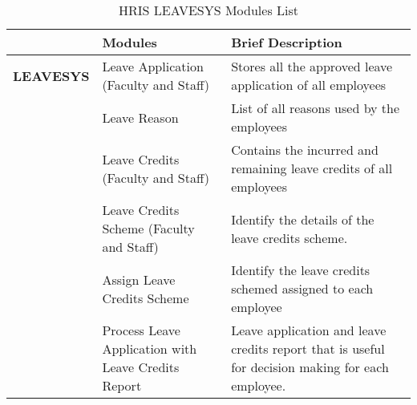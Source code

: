 \begin{table}[H]
\begin{tabular}{@{}p{2cm}p{3.5cm}p{9cm}@{}}
\toprule
\multicolumn{1}{l}{} & \textbf{Modules}                                    & \textbf{Brief Description}                                                                       \\ \midrule
\textbf{LEAVESYS}    & Leave Application (Faculty and Staff)               & Stores all the approved leave application of all employees                                       \\
                        & Leave Reason                                        & List of all reasons used by the employees                                                        \\
                        & Leave Credits (Faculty and Staff)                   & Contains the incurred and remaining leave credits of all employees                               \\
                        & Leave Credits Scheme (Faculty and Staff)            & Identify the details of the leave credits scheme.                                                \\
                        & Assign Leave Credits Scheme                         & Identify the leave credits schemed assigned to each employee                                     \\
                        & Process Leave Application with Leave Credits Report & Leave application and leave credits report that is useful for decision making for each employee. \\ \bottomrule
\end{tabular}
\caption{HRIS LEAVESYS Modules List}
\label{tab:my_label}
\end{table}

